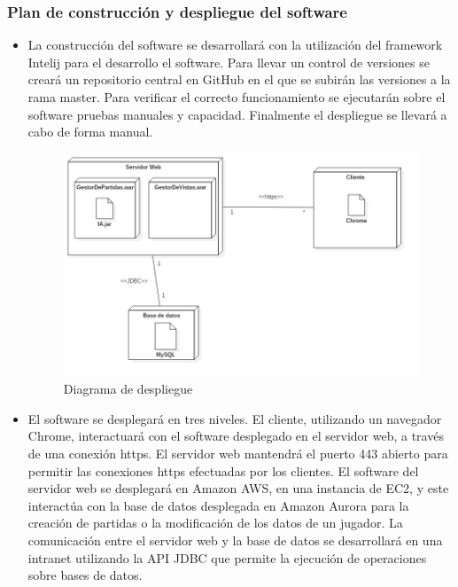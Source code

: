 \subsubsection{Plan de construcción y despliegue del software}
\begin{itemize}
\item { La construcción del software se desarrollará con la utilización del framework Intelij para el desarrollo el software. Para llevar un control de versiones se creará un repositorio central en GitHub en el que se subirán las versiones a la rama master. Para verificar el correcto funcionamiento se ejecutarán sobre el software pruebas manuales y capacidad. Finalmente el despliegue se llevará a cabo de forma manual.}
\begin{figure}[H]
\centering
\includegraphics[scale = 0.4]{figuras/despliegue.jpg}
\caption{Diagrama de despliegue}
\label{fig:diagramaDespliegue}
\end{figure}

    \item{ El software se desplegará en tres niveles. El cliente, utilizando un navegador Chrome, interactuará con el software desplegado en el servidor web, a través de una conexión https. El servidor web mantendrá el puerto 443 abierto para permitir las conexiones https efectuadas por los clientes. El software del servidor web se desplegará en Amazon AWS, en una instancia de EC2, y este interactúa con la base de datos desplegada en Amazon Aurora para la creación de partidas o la modificación de los datos de un jugador. La comunicación entre el servidor web y la base de datos se desarrollará en una intranet utilizando la API JDBC que permite la ejecución de operaciones sobre bases de datos.}
\end{itemize}
